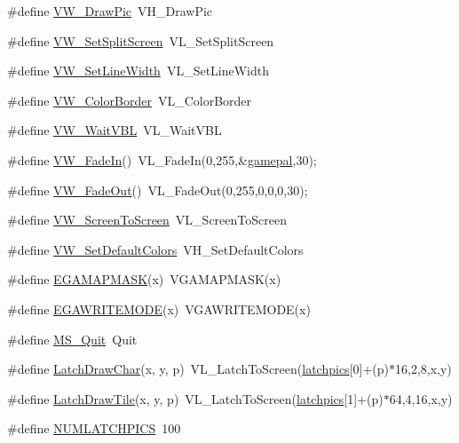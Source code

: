 \begin{DoxyCompactItemize}
\item 
\#define \hyperlink{ID__VH_8H_a5142a115ac994e1dca6714c1d48189d9}{VW\_\-DrawPic}~VH\_\-DrawPic
\item 
\#define \hyperlink{ID__VH_8H_a65007e1b90194be9d47b170f45d52ac5}{VW\_\-SetSplitScreen}~VL\_\-SetSplitScreen
\item 
\#define \hyperlink{ID__VH_8H_a98a09505d8a48143499087c1a4394533}{VW\_\-SetLineWidth}~VL\_\-SetLineWidth
\item 
\#define \hyperlink{ID__VH_8H_a6f21abd5ade208cc64f9286d26a34bbb}{VW\_\-ColorBorder}~VL\_\-ColorBorder
\item 
\#define \hyperlink{ID__VH_8H_addb8bbd36390c7cbe93b5f6979830b17}{VW\_\-WaitVBL}~VL\_\-WaitVBL
\item 
\#define \hyperlink{ID__VH_8H_a8840956c3bd0e4bbb84e43370b3c4931}{VW\_\-FadeIn}()~VL\_\-FadeIn(0,255,\&\hyperlink{WL__PLAY_8C_a72ce00e98a92644d4cbf41fb10a2f7ad}{gamepal},30);
\item 
\#define \hyperlink{ID__VH_8H_a26f3563413a4e382b800ec86868116d4}{VW\_\-FadeOut}()~VL\_\-FadeOut(0,255,0,0,0,30);
\item 
\#define \hyperlink{ID__VH_8H_a1616c0f27ab41adc67c37946ddd9c7ba}{VW\_\-ScreenToScreen}~VL\_\-ScreenToScreen
\item 
\#define \hyperlink{ID__VH_8H_a9941159678d27e9d5cecab32190f4b41}{VW\_\-SetDefaultColors}~VH\_\-SetDefaultColors
\item 
\#define \hyperlink{ID__VH_8H_a37904690538be00dab461585f3626035}{EGAMAPMASK}(x)~VGAMAPMASK(x)
\item 
\#define \hyperlink{ID__VH_8H_a84e603deb67378836be3edebca0e5643}{EGAWRITEMODE}(x)~VGAWRITEMODE(x)
\item 
\#define \hyperlink{ID__VH_8H_ad8efcae5e17b4673b60b3f2d46146405}{MS\_\-Quit}~Quit
\item 
\#define \hyperlink{ID__VH_8H_a6187d93112dc20d56538043c59274ea5}{LatchDrawChar}(x, y, p)~VL\_\-LatchToScreen(\hyperlink{WL__GAME_8C_adbe64e9f4cdaee2e69ce2b915bd5c9ff}{latchpics}\mbox{[}0\mbox{]}+(p)$\ast$16,2,8,x,y)
\item 
\#define \hyperlink{ID__VH_8H_a20ac66827ff4d93b187d39a6d49b658c}{LatchDrawTile}(x, y, p)~VL\_\-LatchToScreen(\hyperlink{WL__GAME_8C_adbe64e9f4cdaee2e69ce2b915bd5c9ff}{latchpics}\mbox{[}1\mbox{]}+(p)$\ast$64,4,16,x,y)
\item 
\#define \hyperlink{ID__VH_8H_a58867ea52d9495b87bc4afa660b92e8a}{NUMLATCHPICS}~100
\end{DoxyCompactItemize}
